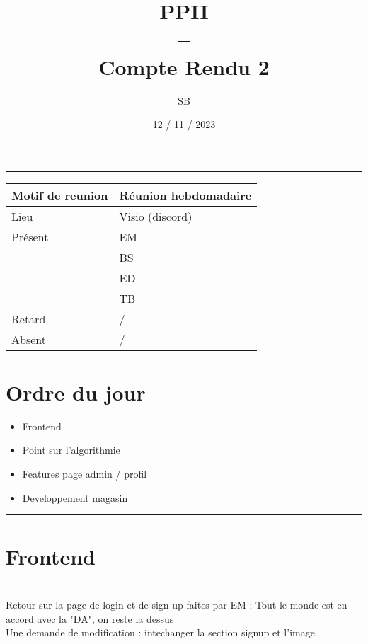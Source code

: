 \documentclass[10pt,a4paper]{report}
\title{PPII \\ -- \\ Compte Rendu 2}
\date{12 / 11 / 2023}
\author{SB}
\begin{document}
\maketitle

\tableofcontents \bigskip

\rule{\linewidth}{0.5mm} \bigskip

                \begin{tabular}{|l | l|}
                        \hline
                Motif de reunion & Réunion hebdomadaire \\
                        \hline
                Lieu & Visio (discord) \\
                        \hline
                Présent & EM \\
                        & BS \\
                        & ED \\
                        & TB  \\
                        \hline
                Retard  & / \\
                        \hline
                Absent  & / \\
                        \hline
                \end{tabular}


\section{Ordre du jour}
\begin{itemize}
        \item Frontend
        \item Point sur l'algorithmie
        \item Features page admin / profil
        \item Developpement magasin
\end{itemize}

\rule{\linewidth}{0.5mm} \bigskip
\section{Frontend}
\ \\

Retour sur la page de login et de sign up faites par EM : Tout le monde est en accord avec la "DA", on reste la dessus \\

Une demande de modification : intechanger la section signup et l'image \\
\end{document}
